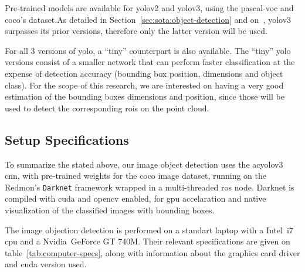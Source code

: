 Pre-trained models are available for \ac{yolo}v2 and \ac{yolo}v3, using the \ac{pascal-voc} and \ac{coco}'s dataset.As detailed in Section~\ref{sec:sota:object-detection} and on~\cite{Redmon2018}, \ac{yolo}v3 surpasses its prior versions, therefore only the latter version will be used. 

For all 3 versions of \ac{yolo}, a ``tiny'' counterpart is also available. The ``tiny'' \ac{yolo} versions consist of a smaller network that can perform faster classification at the expense of detection accuracy (bounding box position, dimensions and object class). For the scope of this research, we are interested on having a very good estimation of the bounding boxes dimensions and position, since those will be used to detect the corresponding \acp{roi} on the point cloud. 

\subsection{Setup Specifications}
To summarize the stated above, our image object detection uses the ac{yolo}v3 \ac{cnn}, with pre-trained weights for the \ac{coco} image dataset, running on the Redmon's \texttt{Darknet} framework wrapped in a multi-threaded \ac{ros} node. Darknet is compiled with \ac{cuda} and \ac{opencv} enabled, for \ac{gpu} accelaration and native visualization of the classified images with bounding boxes.

The image objection detection is performed on a standart laptop with a Intel\cp~i7 \ac{cpu} and a Nvidia\cp~GeForce GT 740M. Their relevant specifications are given on table~\ref{tab:computer-specs}, along with information about the graphics card driver and \ac{cuda} version used.

